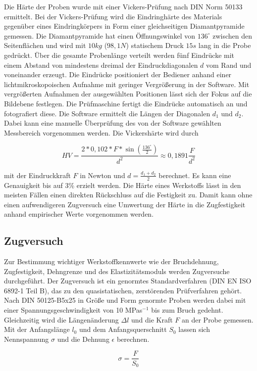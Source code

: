 Die Härte der Proben wurde mit einer Vickers-Prüfung nach DIN Norm 50133 ermittelt. Bei der Vickers-Prüfung wird die Eindringhärte des Materials gegenüber eines Eindringkörpers in Form einer gleichseitigen Diamantpyramide gemessen. Die Diamantpyramide hat einen Öffnungswinkel von $136^\circ$ zwischen den Seitenflächen und wird mit $10 kg$ ($98,1 N$) statischem Druck $15 s$ lang in die Probe gedrückt. Über die gesamte Probenlänge verteilt werden fünf Eindrücke mit einem Abstand von mindestens dreimal der Eindruckdiagonalen $d$ vom Rand und voneinander erzeugt. Die Eindrücke positioniert der Bediener anhand einer lichtmikroskopoischen Aufnahme mit geringer Vergrößerung in der Software. Mit vergrößerten Aufnahmen der ausgewählten Positionen lässt sich der Fokus auf die Bildebene festlegen. Die Prüfmaschine fertigt die Eindrücke automatisch an und fotografiert diese. Die Software ermittelt die Längen der Diagonalen $d_1$ und $d_2$. Dabei kann eine manuelle Überprüfung des von der Software gewählten Messbereich vorgenommen werden. Die Vickershärte wird durch

$$HV=\frac {2*0,102*F*\sin \left( \frac{136^\circ}{2}\right) } {d^2} \approx 0,1891 \frac{F}{d^2}$$

mit der Eindruckkraft $F$ in Newton und $d=\frac {d_1 + d_2}{2} $ berechnet. Es kann eine Genauigkeit bis auf 3\% erzielt werden.  Die Härte eines Werkstoffs lässt in den meisten Fällen einen direkten Rückschluss auf die Festigkeit zu. Damit kann ohne einen aufwendigeren Zugversuch eine Umwertung der Härte in die Zugfestigkeit anhand empirischer Werte vorgenommen werden. 

\subsection*{Zugversuch}
Zur Bestimmung wichtiger Werkstoffkennwerte wie der Bruchdehnung, Zugfestigkeit, Dehngrenze und des Elastizitätsmoduls werden Zugversuche durchgeführt. Der Zugversuch ist ein genormtes Standardverfahren (DIN EN ISO 6892-1 Teil B), das zu den quasistatischen, zerstörenden Prüfverfahren gehört. Nach DIN 50125-B5x25 in Größe und Form genormte Proben werden dabei mit einer Spannungsgeschwindigkeit von 10 MPas$^{-1}$ bis zum Bruch gedehnt. Gleichzeitig wird die Längenänderung $\Delta l$ und die Kraft $F$ an der Probe gemessen. Mit der Anfangslänge $l_0$ und dem Anfangsquerschnitt $S_0$ lassen sich Nennspannung $\sigma$ und die Dehnung $\epsilon$ berechnen.

$$\sigma=\frac{F}{S_0}$$

